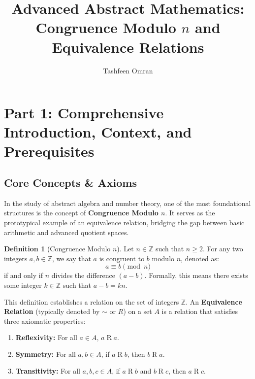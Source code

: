 \documentclass[11pt, a4paper]{article}
\theoremstyle{definition}
\newtheorem{definition}{Definition}[section]
\theoremstyle{remark}
\begin{document}
\title{\textbf{Advanced Abstract Mathematics: \\ Congruence Modulo $n$ and Equivalence Relations}}
\author{Tashfeen Omran}
\date{}
\maketitle

\tableofcontents
\newpage

\section{Part 1: Comprehensive Introduction, Context, and Prerequisites}

\subsection{Core Concepts \& Axioms}
In the study of abstract algebra and number theory, one of the most foundational structures is the concept of \textbf{Congruence Modulo $n$}. It serves as the prototypical example of an equivalence relation, bridging the gap between basic arithmetic and advanced quotient spaces. 

\begin{definition}[Congruence Modulo $n$]
Let $n \in \mathbb{Z}$ such that $n \geq 2$. For any two integers $a, b \in \mathbb{Z}$, we say that $a$ is congruent to $b$ modulo $n$, denoted as:
\[ \displaystyle a \equiv b \pmod{n} \]
if and only if $n$ divides the difference $(a - b)$. Formally, this means there exists some integer $k \in \mathbb{Z}$ such that $a - b = kn$.
\end{definition}

This definition establishes a relation on the set of integers $\mathbb{Z}$. An \textbf{Equivalence Relation} (typically denoted by $\sim$ or $R$) on a set $A$ is a relation that satisfies three axiomatic properties:
\begin{enumerate}
    \item \textbf{Reflexivity:} For all $a \in A$, $a \mathrel{R} a$.
    \item \textbf{Symmetry:} For all $a, b \in A$, if $a \mathrel{R} b$, then $b \mathrel{R} a$.
    \item \textbf{Transitivity:} For all $a, b, c \in A$, if $a \mathrel{R} b$ and $b \mathrel{R} c$, then $a \mathrel{R} c$.
\end{enumerate}
\end{document}
